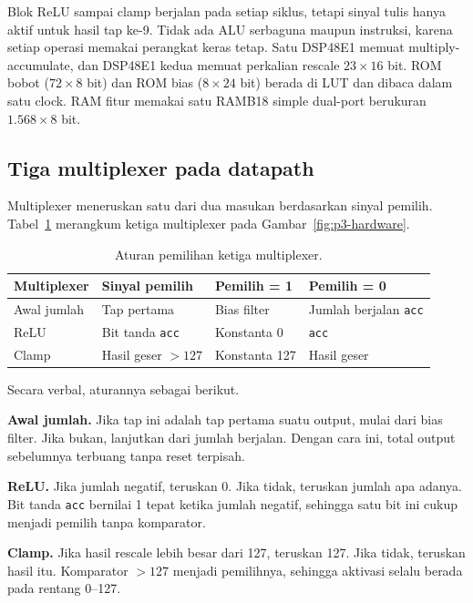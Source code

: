 \documentclass[11pt,a4paper]{article}
\begin{document}
Blok ReLU sampai clamp berjalan pada setiap siklus, tetapi sinyal tulis hanya
aktif untuk hasil tap ke-9. Tidak ada ALU serbaguna maupun instruksi, karena
setiap operasi memakai perangkat keras tetap. Satu DSP48E1 memuat
multiply-accumulate, dan DSP48E1 kedua memuat perkalian rescale
\(23\times16\) bit. ROM bobot (\(72\times8\) bit) dan ROM bias (\(8\times24\)
bit) berada di LUT dan dibaca dalam satu clock. RAM fitur memakai satu RAMB18
simple dual-port berukuran \(1.568\times8\) bit.

\subsection{Tiga multiplexer pada datapath}
Multiplexer meneruskan satu dari dua masukan berdasarkan sinyal pemilih.
Tabel~\ref{tab:p3-mux} merangkum ketiga multiplexer pada
Gambar~\ref{fig:p3-hardware}.

\begin{table}[H]
\centering\small
\caption{Aturan pemilihan ketiga multiplexer.}
\label{tab:p3-mux}
\begin{tabular}{llll}
\toprule
Multiplexer & Sinyal pemilih & Pemilih = 1 & Pemilih = 0 \\
\midrule
Awal jumlah & Tap pertama & Bias filter & Jumlah berjalan \texttt{acc} \\
ReLU & Bit tanda \texttt{acc} & Konstanta 0 & \texttt{acc} \\
Clamp & Hasil geser \(>127\) & Konstanta 127 & Hasil geser \\
\bottomrule
\end{tabular}
\end{table}

Secara verbal, aturannya sebagai berikut.

\textbf{Awal jumlah.} Jika tap ini adalah tap pertama suatu output, mulai dari
bias filter. Jika bukan, lanjutkan dari jumlah berjalan. Dengan cara ini, total
output sebelumnya terbuang tanpa reset terpisah.

\textbf{ReLU.} Jika jumlah negatif, teruskan 0. Jika tidak, teruskan jumlah apa
adanya. Bit tanda \texttt{acc} bernilai 1 tepat ketika jumlah negatif, sehingga
satu bit ini cukup menjadi pemilih tanpa komparator.

\textbf{Clamp.} Jika hasil rescale lebih besar dari 127, teruskan 127. Jika
tidak, teruskan hasil itu. Komparator \(>127\) menjadi pemilihnya, sehingga
aktivasi selalu berada pada rentang 0--127.
\end{document}
